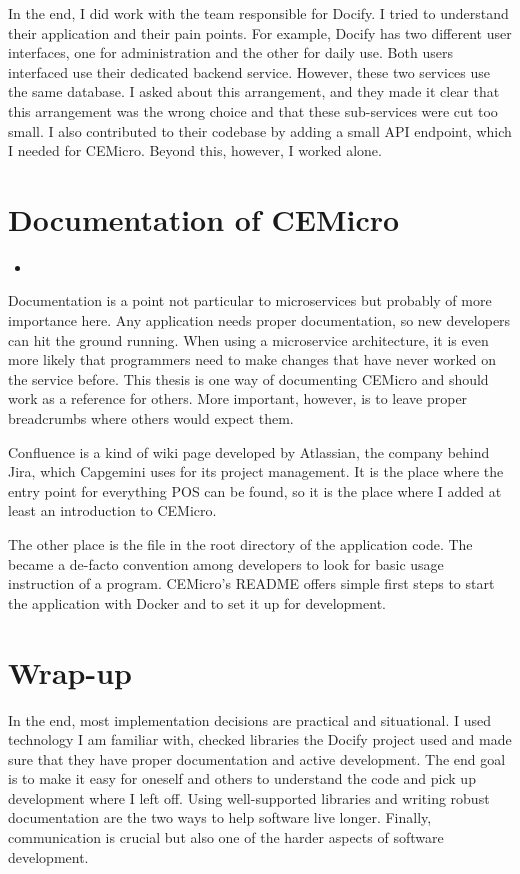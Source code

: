 In the end, I did work with the team responsible for Docify. I tried to understand their application and their pain points. For example, Docify has two different user interfaces, one for administration and the other for daily use. Both users interfaced use their dedicated backend service. However, these two services use the same database. I asked about this arrangement, and they made it clear that this arrangement was the wrong choice and that these sub-services were cut too small. I also contributed to their codebase by adding a small API endpoint, which I needed for CEMicro. Beyond this, however, I worked alone.


\section{Documentation of CEMicro}

\begin{itemize}
  \item {}
\end{itemize}

Documentation is a point not particular to microservices but probably of more importance here. Any application needs proper documentation, so new developers can hit the ground running. When using a microservice architecture, it is even more likely that programmers need to make changes that have never worked on the service before. This thesis is one way of documenting CEMicro and should work as a reference for others. More important, however, is to leave proper breadcrumbs where others would expect them.

Confluence is a kind of wiki page developed by Atlassian, the company behind Jira, which Capgemini uses for its project management. It is the place where the entry point for everything POS can be found, so it is the place where I added at least an introduction to CEMicro.

The other place is the  file in the root directory of the application code. The  became a de-facto convention among developers to look for basic usage instruction of a program. CEMicro's README offers simple first steps to start the application with Docker and to set it up for development.


\section{Wrap-up}

In the end, most implementation decisions are practical and situational. I used technology I am familiar with, checked libraries the Docify project used and made sure that they have proper documentation and active development. The end goal is to make it easy for oneself and others to understand the code and pick up development where I left off. Using well-supported libraries and writing robust documentation are the two ways to help software live longer. Finally, communication is crucial but also one of the harder aspects of software development.



